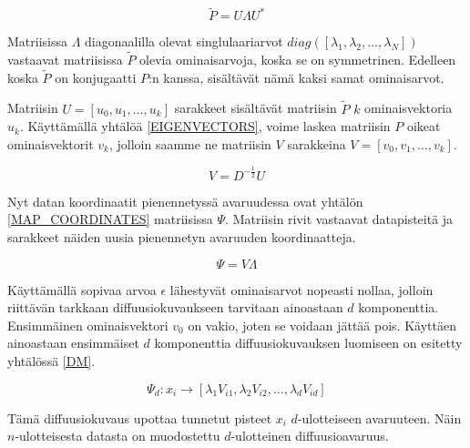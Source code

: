 \begin{equation}
\tilde{P} = U \Lambda U^*
\label{SVD}
\end{equation}


\noindent Matriisissa $\Lambda$ diagonaalilla olevat singlulaariarvot $diag([\lambda_1, \lambda_2, \dots, \lambda_N])$ vastaavat matriisissa $\tilde{P}$ olevia ominaisarvoja, koska se on symmetrinen. Edelleen koska $\tilde{P}$ on konjugaatti $P$:n kanssa, sisältävät nämä kaksi samat ominaisarvot. 

Matriisin $U = [ u_0, u_1, \dots, u_k ]$ sarakkeet sisältävät matriisin $\tilde{P}$ $k$ ominaisvektoria $u_k$. Käyttämällä yhtälöä \ref{EIGENVECTORS}, voime laskea matriisin $P$ oikeat ominaisvektorit $v_k$, jolloin 
saamme ne matriisin $V$ sarakkeina  $V = [v_0, v_1, \dots, v_k]$.  

\begin{equation}
V = D^{-\frac{1}{2}} U
\label{EIGENVECTORS}
\end{equation}

\noindent Nyt datan koordinaatit pienennetyssä avaruudessa ovat yhtälön \ref{MAP_COORDINATES} matriisissa $\Psi$. Matriisin rivit vastaavat datapisteitä ja sarakkeet näiden uusia pienennetyn avaruuden koordinaatteja.

\begin{equation}
\Psi = V \Lambda
\label{MAP_COORDINATES}
\end{equation}


\noindent Käyttämällä sopivaa arvoa $\epsilon$ lähestyvät ominaisarvot nopeasti nollaa, jolloin riittävän tarkkaan diffuusiokuvaukseen tarvitaan ainoastaan $d$ komponenttia. Ensimmäinen ominaisvektori $v_0$ on vakio, joten se voidaan jättää pois.
Käyttäen ainoastaan ensimmäiset $d$ komponenttia diffuusiokuvauksen luomiseen on esitetty yhtälössä \ref{DM}.

\begin{equation}
\Psi_d : x_i \to \left[ \lambda_1 V_{i1}, \lambda_2 V_{i2}, \dots, \lambda_d V_{id} \right]
\label{DM}
\end{equation}

\noindent Tämä diffuusiokuvaus upottaa tunnetut pisteet $x_i$ $d$-ulotteiseen avaruuteen. 
Näin $n$-ulotteisesta datasta on muodostettu $d$-ulotteinen diffuusioavaruus.

